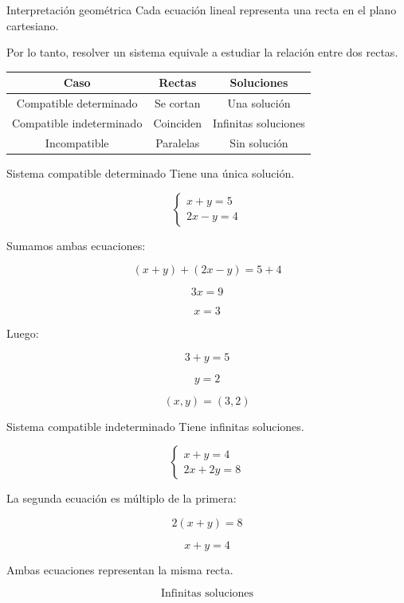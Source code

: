 \documentclass[aspectratio=169]{beamer}
\begin{document}
	\begin{frame}{Interpretación geométrica}
		Cada ecuación lineal representa una recta en el plano cartesiano.
		
		\bigskip
		
		Por lo tanto, resolver un sistema equivale a estudiar la relación entre dos rectas.
		
		\bigskip
		
		\begin{center}
			\begin{tabular}{|c|c|c|}
				\hline
				\textbf{Caso} & \textbf{Rectas} & \textbf{Soluciones} \\
				\hline
				Compatible determinado & Se cortan & Una solución \\
				\hline
				Compatible indeterminado & Coinciden & Infinitas soluciones \\
				\hline
				Incompatible & Paralelas & Sin solución \\
				\hline
			\end{tabular}
		\end{center}
	\end{frame}
	
	\begin{frame}{Sistema compatible determinado}
		Tiene una única solución.
		
		\[
		\begin{cases}
			x+y=5\\
			2x-y=4
		\end{cases}
		\]
		
		\bigskip
		
		Sumamos ambas ecuaciones:
		
		\[
		(x+y)+(2x-y)=5+4
		\]
		
		\[
		3x=9
		\]
		
		\[
		x=3
		\]
		
		Luego:
		
		\[
		3+y=5
		\]
		
		\[
		y=2
		\]
		
		\[
		\boxed{(x,y)=(3,2)}
		\]
	\end{frame}
	
	\begin{frame}{Sistema compatible indeterminado}
		Tiene infinitas soluciones.
		
		\[
		\begin{cases}
			x+y=4\\
			2x+2y=8
		\end{cases}
		\]
		
		La segunda ecuación es múltiplo de la primera:
		
		\[
		2(x+y)=8
		\]
		
		\[
		x+y=4
		\]
		
		\bigskip
		
		Ambas ecuaciones representan la misma recta.
		
		\[
		\boxed{\text{Infinitas soluciones}}
		\]
	\end{frame}
	
\end{document}
